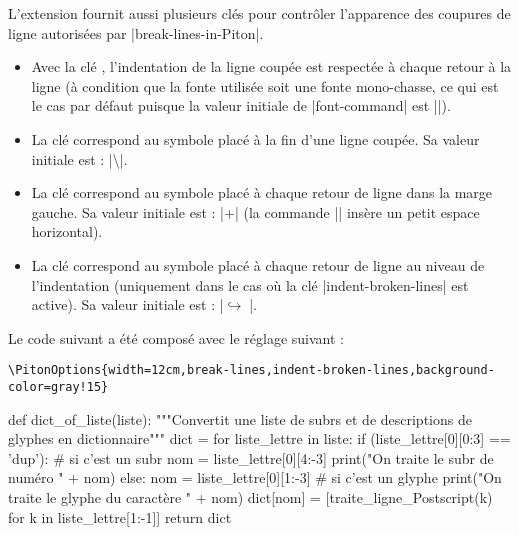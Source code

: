 \documentclass[dvipsnames,svgnames]{article}
\begin{document}
\medskip
L'extension  fournit aussi plusieurs clés pour contrôler l'apparence des
coupures de ligne autorisées par |break-lines-in-Piton|.

\begin{itemize}
\item {} Avec la clé ,
l'indentation de la ligne coupée est respectée à chaque retour à la ligne (à condition que
la fonte utilisée soit une fonte mono-chasse, ce qui est le cas par défaut puisque la
valeur initiale de |font-command| est |\ttfamily|).

\item {} La clé  correspond au
symbole placé à la fin d'une ligne coupée. Sa valeur initiale est :
|\hspace*{0.5em}\textbackslash|.

\item {} La clé  correspond au
symbole placé à chaque retour de ligne dans la marge gauche. Sa valeur initiale est :
|+\;| (la commande |\;| insère un petit espace horizontal).

\item {} La clé
 correspond au symbole placé à chaque
retour de ligne au niveau de l'indentation (uniquement dans le cas où la clé
|indent-broken-lines| est active). Sa valeur initiale est : |$\hookrightarrow\;$|.
\end{itemize}

\bigskip
Le code suivant a été composé avec le réglage suivant :  

\begin{Verbatim}
\PitonOptions{width=12cm,break-lines,indent-broken-lines,background-color=gray!15}
\end{Verbatim}


\begin{center}
\begin{Piton}
def dict_of_liste(liste):
    """Convertit une liste de subrs et de descriptions de glyphes en dictionnaire"""
    dict = {}
    for liste_lettre in liste:
        if (liste_lettre[0][0:3] == 'dup'): # si c'est un subr
            nom = liste_lettre[0][4:-3]
            print("On traite le subr de numéro " + nom)
        else:
            nom = liste_lettre[0][1:-3] # si c'est un glyphe
            print("On traite le glyphe du caractère " + nom)
        dict[nom] = [traite_ligne_Postscript(k) for k in liste_lettre[1:-1]]
    return dict
\end{Piton}
\end{center}
\end{document}
